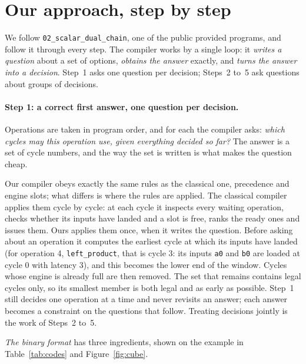 \documentclass[11pt,a4paper]{article}
\begin{document}
\section{Our approach, step by step}\label{sec:steps}

We follow \texttt{02\_scalar\_dual\_chain}, one of the public provided programs,
 and follow it through every step. The compiler works
by a single loop: it \emph{writes a question} about a set of options, \emph{obtains
the answer} exactly, and \emph{turns the answer into a decision}. Step~1 asks one
question per decision; Steps~2 to~5 ask questions about groups of decisions.

\paragraph{Step 1: a correct first answer, one question per decision.} Operations
are taken in program order, and for each the compiler asks: \emph{which cycles may
this operation use, given everything decided so far?} The answer is a set of cycle
numbers, and the way the set is written is what makes the question cheap.

Our compiler obeys exactly the same rules as the classical one, precedence and
engine slots; what differs is where the rules are applied. The classical compiler
applies them cycle by cycle: at each cycle it inspects every waiting operation,
checks whether its inputs have landed and a slot is free, ranks the ready ones and
issues them. Ours applies them once, when it writes the question. Before asking
about an operation it computes the earliest cycle at which its inputs have landed
(for operation 4, \texttt{left\_product}, that is cycle 3: its inputs \texttt{a0} and
\texttt{b0} are loaded at cycle 0 with latency 3), and this becomes the lower end
of the window. Cycles whose engine is already full are then removed. The set that
remains contains legal cycles only, so its smallest member is both legal and as
early as possible. Step~1 still decides one operation at a time and never revisits
an answer; each answer becomes a constraint on the questions that follow. Treating
decisions jointly is the work of Steps~2 to~5.

\emph{The binary format} has three ingredients, shown on the example in
Table~\ref{tab:codes} and Figure~\ref{fig:cube}.
\end{document}
